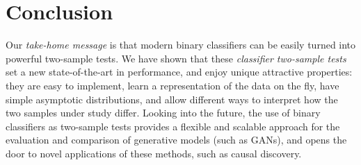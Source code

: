 \documentclass[a4paper]{article}
\begin{document}
  \section{Conclusion}
  Our \emph{take-home message} is that modern binary classifiers
  can be easily turned into powerful two-sample tests. We have shown that these
  \emph{classifier two-sample tests} set a new state-of-the-art in performance,
  and enjoy unique attractive properties: they are easy to implement, learn a
  representation of the data on the fly, have simple asymptotic distributions,
  and allow different ways to interpret how the two samples under study differ.
  Looking into the future, the use of binary classifiers as two-sample tests
  provides a flexible and scalable approach for the evaluation and comparison
  of generative models (such as GANs), and opens the door to novel applications of these
  methods, such as causal discovery.
  
  
  

  \clearpage
  \newpage
  \appendix
\end{document}

